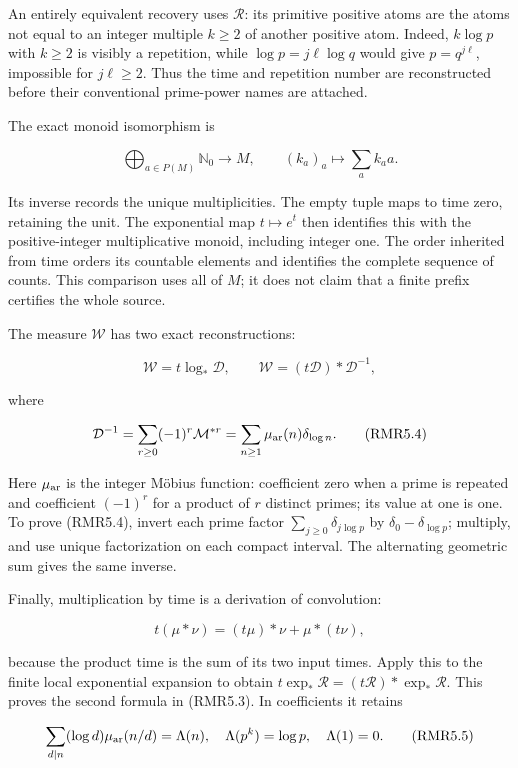 \documentclass[
]{article}
\begin{document}
An entirely equivalent recovery uses \(\mathcal R\): its primitive
positive atoms are the atoms not equal to an integer multiple \(k\ge2\)
of another positive atom. Indeed, \(k\log p\) with \(k\ge2\) is visibly
a repetition, while \(\log p=j\ell\log q\) would give \(p=q^{j\ell}\),
impossible for \(j\ell\ge2\). Thus the time and repetition number are
reconstructed before their conventional prime-power names are attached.

The exact monoid isomorphism is

\[
\bigoplus_{a\in P(M)}\mathbb N_0\longrightarrow M,
\qquad (k_a)_a\longmapsto\sum_a k_a a.
\tag{RMR5.2}
\]

Its inverse records the unique multiplicities. The empty tuple maps to
time zero, retaining the unit. The exponential map \(t\mapsto e^t\) then
identifies this with the positive-integer multiplicative monoid,
including integer one. The order inherited from time orders its
countable elements and identifies the complete sequence of counts. This
comparison uses all of \(M\); it does not claim that a finite prefix
certifies the whole source.

The measure \(\mathcal W\) has two exact reconstructions:

\[
\mathcal W=t\log_*\mathcal D,
\qquad
\mathcal W=(t\mathcal D)*\mathcal D^{-1},
\tag{RMR5.3}
\]

where

\[
\mathcal D^{-1}=\sum_{r\ge0}(-1)^r\mathcal M^{*r}
=\sum_{n\ge1}\mu_{\rm ar}(n)\delta_{\log n}.
\tag{RMR5.4}
\]

Here \(\mu_{\rm ar}\) is the integer Möbius function: coefficient zero
when a prime is repeated and coefficient \((-1)^r\) for a product of
\(r\) distinct primes; its value at one is one. To prove (RMR5.4),
invert each prime factor \(\sum_{j\ge0}\delta_{j\log p}\) by
\(\delta_0-\delta_{\log p}\); multiply, and use unique factorization on
each compact interval. The alternating geometric sum gives the same
inverse.

Finally, multiplication by time is a derivation of convolution:

\[
t(\mu*\nu)=(t\mu)*\nu+\mu*(t\nu),
\]

because the product time is the sum of its two input times. Apply this
to the finite local exponential expansion to obtain
\(t\exp_*\mathcal R=(t\mathcal R)*\exp_*\mathcal R\). This proves the
second formula in (RMR5.3). In coefficients it retains

\[
\sum_{d\mid n}(\log d)\mu_{\rm ar}(n/d)=\Lambda(n),
\quad
\Lambda(p^k)=\log p,\quad \Lambda(1)=0.
\tag{RMR5.5}
\]
\end{document}
